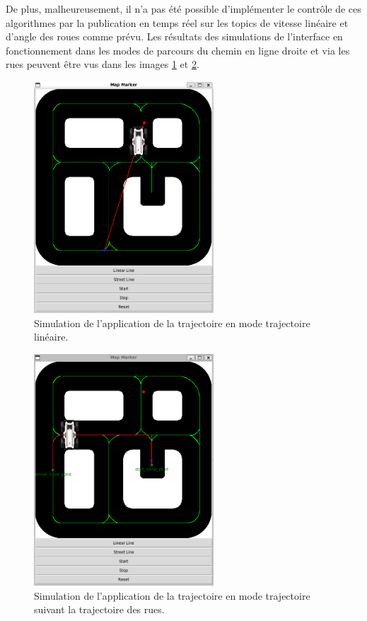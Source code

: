 De plus, malheureusement, il n'a pas été possible d'implémenter le contrôle de ces algorithmes par la publication en temps réel sur les topics de vitesse linéaire et d'angle des roues comme prévu. Les résultats des simulations de l'interface en fonctionnement dans les modes de parcours du chemin en ligne droite et via les rues peuvent être vus dans les images \ref{img:linear_line} et \ref{img:street_line}.

\FloatBarrier
\begin{figure}[!h]
    \centering
    \includegraphics[width=0.6\textwidth]{img/background/linear_line.png} 
    \caption{Simulation de l'application de la trajectoire en mode trajectoire linéaire.}
    \label{img:linear_line}
\end{figure}

\FloatBarrier

\begin{figure}[!h]
    \centering
    \includegraphics[width=0.6\textwidth]{img/background/street_line.png} 
    \caption{Simulation de l'application de la trajectoire en mode trajectoire suivant la trajectoire des rues.}
    \label{img:street_line}
\end{figure}
\FloatBarrier


